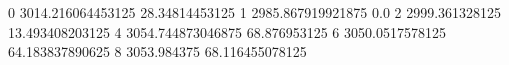 0 3014.216064453125 28.34814453125
1 2985.867919921875 0.0
2 2999.361328125 13.493408203125
4 3054.744873046875 68.876953125
6 3050.0517578125 64.183837890625
8 3053.984375 68.116455078125
